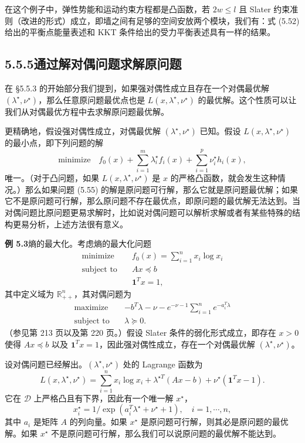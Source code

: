 \documentclass[UTF8, 12pt, fontset=fandol, oneside]{ctexart}
\begin{document}
在这个例子中，弹性势能和运动约束方程都是凸函数，若 $2w\leq l$ 且 Slater 约束准则（改进的形式）成立，即墙之间有足够的空间安放两个模块，我们有：式 (5.52) 给出的平衡点能量表述和 KKT 条件给出的受力平衡表述具有一样的结果。

\subsection*{5.5.5\quad 通过解对偶问题求解原问题}

在 \S 5.5.3 的开始部分我们提到，如果强对偶性成立且存在一个对偶最优解 $(\lambda^\star,\nu^\star)$，那么任意原问题最优点也是 $L(x,\lambda^\star,\nu^\star)$ 的最优解。这个性质可以让我们从对偶最优方程中去求解原问题最优解。

更精确地，假设强对偶性成立，对偶最优解 $(\lambda^\star,\nu^\star)$ 已知。假设 $L(x,\lambda^\star,\nu^\star)$ 的最小点，即下列问题的解
\[
\text{minimize}\quad f_0(x)+\sum_{i=1}^m\lambda_i^\star f_i(x)+\sum_{i=1}^p\nu_i^\star h_i(x),
\tag{5.55}
\]
唯一。（对于凸问题，如果 $L(x,\lambda^\star,\nu^\star)$ 是 $x$ 的严格凸函数，就会发生这种情况。）那么如果问题 (5.55) 的解是原问题可行解，那么它就是原问题最优解；如果它不是原问题可行解，那么原问题不存在最优点，即原问题的最优解无法达到。当对偶问题比原问题更易求解时，比如说对偶问题可以解析求解或者有某些特殊的结构更易分析，上述方法很有意义。

\noindent\textbf{例 5.3}\quad 熵的最大化。考虑熵的最大化问题
\[
\begin{aligned}
\text{minimize}\quad & f_0(x)=\sum_{i=1}^n x_i\log x_i\\
\text{subject to}\quad & Ax\preceq b\\
& \mathbf{1}^Tx=1,
\end{aligned}
\]
其中定义域为 $\mathbb{R}_{++}^n$，其对偶问题为
\[
\begin{aligned}
\text{maximize}\quad & -b^T\lambda-\nu-e^{-\nu-1}\sum_{i=1}^n e^{-a_i^T\lambda}\\
\text{subject to}\quad & \lambda\succeq 0.
\end{aligned}
\]
（参见第 213 页以及第 220 页。）假设 Slater 条件的弱化形式成立，即存在 $x>0$ 使得 $Ax\preceq b$ 以及 $\mathbf{1}^Tx=1$，因此强对偶性成立，存在一个对偶最优解 $(\lambda^\star,\nu^\star)$。

设对偶问题已经解出。$(\lambda^\star,\nu^\star)$ 处的 Lagrange 函数为
\[
L(x,\lambda^\star,\nu^\star)=\sum_{i=1}^n x_i\log x_i+\lambda^{\star T}(Ax-b)+\nu^\star(\mathbf{1}^Tx-1).
\]
它在 $\mathcal{D}$ 上严格凸且有下界，因此有一个唯一解 $x^\star$，
\[
x_i^\star=1/\exp(a_i^T\lambda^\star+\nu^\star+1),\quad i=1,\cdots,n,
\]
其中 $a_i$ 是矩阵 $A$ 的列向量。如果 $x^\star$ 是原问题可行解，则其必是原问题的最优解。如果 $x^\star$ 不是原问题可行解，那么我们可以说原问题的最优解不能达到。
\end{document}
